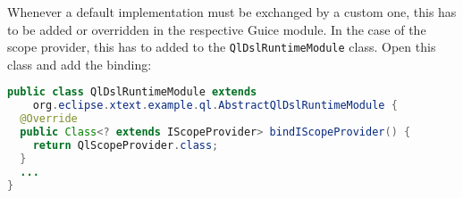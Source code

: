 Whenever a default implementation must be exchanged by a custom one, this has to be added or overridden in the respective Guice module.
In the case of the scope provider, this has to added to the \texttt{QlDslRuntimeModule} class. Open this class and add the binding:

\begin{lstlisting}[language=Java]
public class QlDslRuntimeModule extends
    org.eclipse.xtext.example.ql.AbstractQlDslRuntimeModule {
  @Override
  public Class<? extends IScopeProvider> bindIScopeProvider() {
    return QlScopeProvider.class;
  }
  ...
}
\end{lstlisting}


